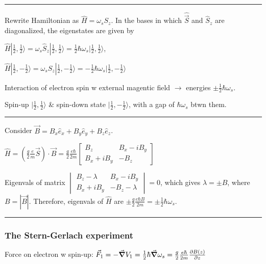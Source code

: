 \hrule height 0.05pt

Rewrite Hamiltonian as $\widehat{H} = \omega_s S_z$. In the bases in which $\widehat{\vec{S}}$ and $\widehat{S}_z$ are diagonalized, the eigenstates are given by 

$\widehat{H} | \frac{1}{2}, \frac{1}{2} \rangle = \omega_s \widehat{S}_z | \frac{1}{2}, \frac{1}{2} \rangle = \frac{1}{2} \hbar \omega_s | \frac{1}{2}, \frac{1}{2} \rangle$, 

$\widehat{H} | \frac{1}{2}, -\frac{1}{2} \rangle = \omega_s \widehat{S}_z | \frac{1}{2}, -\frac{1}{2} \rangle = - \frac{1}{2} \hbar \omega_s | \frac{1}{2}, -\frac{1}{2} \rangle$

Interaction of electron spin w external magentic field $\rightarrow$ energies $\pm \frac{1}{2} \hbar \omega_s$. 

Spin-up $| \frac{1}{2}, \frac{1}{2} \rangle$ \& spin-down state $|\frac{1}{2}, -\frac{1}{2} \rangle$, with a gap of $\hbar \omega_s$ btwn them.

\hrule height 0.05pt


Consider $\vec{B} = B_x \widehat{e}_x + B_y \widehat{e}_y + B_z \widehat{e}_z$. 

$\widehat{H} = (\frac{g}{2} \frac{e}{m} \vec{S}) \cdot \vec{B} = \frac{g}{2} \frac{e \hbar}{2m} \begin{bmatrix} B_z & B_x - i B_y \\ B_x + i B_y & -B_z \end{bmatrix}$

Eigenvals of matrix $\begin{vmatrix} B_z - \lambda & B_x - iB_y \\ B_x + iB_y & -B_z - \lambda \end{vmatrix} = 0$, which gives $\lambda = \pm B$, where $B = |\vec{B}|$. Therefore, eigenvals of $\widehat{H}$ are $\pm \frac{g}{2} \frac{e \hbar B}{2m} = \pm \frac{1}{2} \hbar \omega_s$.

\hrule height 0.05pt

\subsubsection{The Stern-Gerlach experiment} \hfill

Force on electron w spin-up: $\vec{F}_1 = -\vec{\grad} V_1 = \frac{1}{2} \hbar \vec{\grad} \omega_s = \frac{g}{2} \frac{e \hbar}{2m} \pdv{B(z)}{z}$

